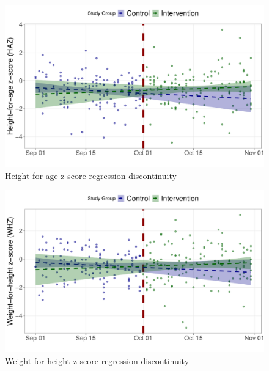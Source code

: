 \documentclass[12pt,a4paper]{article}
\begin{document}
\begin{figure}[H]

{\centering \includegraphics{kayinReport_files/figure-latex/rd3a-1} 

}

\caption{Height-for-age z-score regression discontinuity}\label{fig:rd3a}
\end{figure}

\begin{figure}[H]

{\centering \includegraphics{kayinReport_files/figure-latex/rd4a-1} 

}

\caption{Weight-for-height z-score regression discontinuity}\label{fig:rd4a}
\end{figure}
\end{document}
